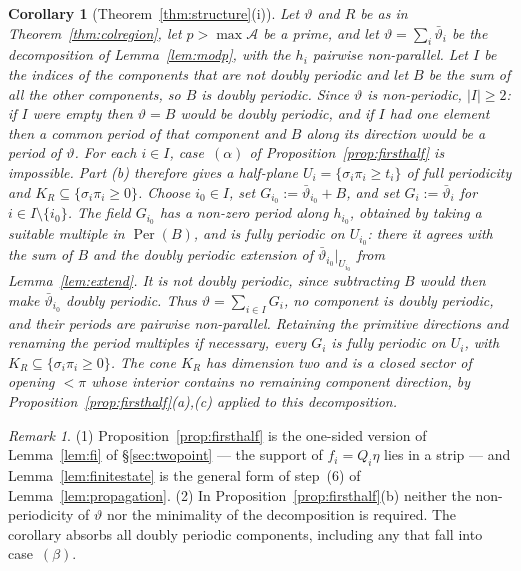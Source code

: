 \documentclass[11pt,reqno]{amsart}
\theoremstyle{plain}
\newtheorem{cor}[thm]{Corollary}
\theoremstyle{definition}
\theoremstyle{remark}
\newtheorem{rem}[thm]{Remark}
\theoremstyle{plain}
\theoremstyle{remark}
\theoremstyle{definition}
\numberwithin{equation}{section}
\DeclareMathOperator{\Per}{Per}
\newcommand{\cA}{\mathcal{A}}
\begin{document}
\begin{cor}[Theorem~\ref{thm:structure}(i)]\label{cor:firsthalf}
Let $\vartheta$ and $R$ be as in Theorem~\ref{thm:colregion}, let $p>\max\cA$ be
a prime, and let $\vartheta=\sum_i\bar\vartheta_i$ be the decomposition of
Lemma~\ref{lem:modp}, with the $h_i$ pairwise non-parallel.  Let $I$ be the
indices of the components that are not doubly periodic and let $B$ be the sum
of all the other components, so $B$ is doubly periodic.  Since $\vartheta$ is
non-periodic, $|I|\ge2$: if $I$ were empty then $\vartheta=B$ would be doubly
periodic, and if $I$ had one element then a common period of that component
and $B$ along its direction would be a period of $\vartheta$.
For each $i\in I$, case~$(\alpha)$ of Proposition~\ref{prop:firsthalf} is
impossible.  Part (b) therefore gives a half-plane
$U_i=\{\sigma_i\pi_i\ge t_i\}$ of full periodicity and
$K_R\subseteq\{\sigma_i\pi_i\ge0\}$.
Choose $i_0\in I$, set $G_{i_0}:=\bar\vartheta_{i_0}+B$, and set
$G_i:=\bar\vartheta_i$ for $i\in I\setminus\{i_0\}$.
The field $G_{i_0}$ has a non-zero period along $h_{i_0}$, obtained by taking
a suitable multiple in $\Per(B)$, and is fully periodic on $U_{i_0}$:
there it agrees with the sum of $B$ and the doubly periodic extension of
$\bar\vartheta_{i_0}|_{U_{i_0}}$ from Lemma~\ref{lem:extend}.
It is not doubly periodic, since subtracting $B$ would then make
$\bar\vartheta_{i_0}$ doubly periodic.
Thus $\vartheta=\sum_{i\in I}G_i$, no component is doubly periodic, and their
periods are pairwise non-parallel.  Retaining the primitive directions and
renaming the period multiples if necessary, every $G_i$ is fully periodic on
$U_i$, with $K_R\subseteq\{\sigma_i\pi_i\ge0\}$.  The cone $K_R$ has
dimension two and is a closed sector of opening $<\pi$ whose interior
contains no remaining component direction, by
Proposition~\ref{prop:firsthalf}(a),(c) applied to this decomposition.
\end{cor}

\begin{rem}\label{rem:relation}
\textup{(1)} Proposition~\ref{prop:firsthalf} is the one-sided version of
Lemma~\ref{lem:fi} of \S\ref{sec:twopoint} — the support of $f_i=Q_i\eta$
lies in a strip — and Lemma~\ref{lem:finitestate} is the general form of
step~(6) of Lemma~\ref{lem:propagation}.
\textup{(2)} In Proposition~\ref{prop:firsthalf}(b) neither the non-periodicity
of $\vartheta$ nor the minimality of the decomposition is required.  The
corollary absorbs all doubly periodic components, including any that fall
into case~$(\beta)$.
\end{rem}
\end{document}
